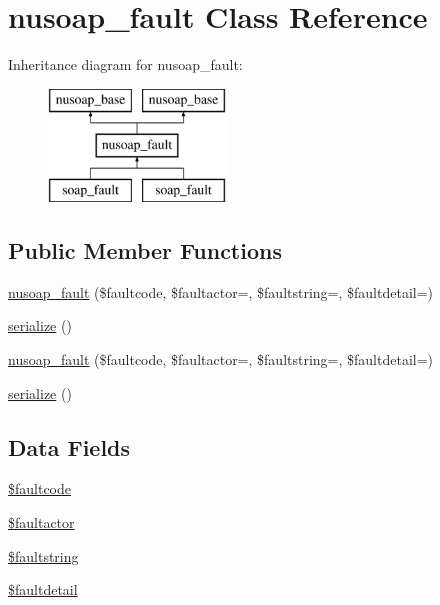 \hypertarget{classnusoap__fault}{}\section{nusoap\+\_\+fault Class Reference}
\label{classnusoap__fault}
Inheritance diagram for nusoap\+\_\+fault\+:\begin{figure}[H]
\begin{center}
\leavevmode
\includegraphics[height=3.000000cm]{classnusoap__fault}
\end{center}
\end{figure}
\subsection*{Public Member Functions}
\begin{DoxyCompactItemize}
\item 
\hyperlink{classnusoap__fault_a265d45a8d19659ed10f6956f5ee230dc}{nusoap\+\_\+fault} (\$faultcode, \$faultactor=\textquotesingle{}\textquotesingle{}, \$faultstring=\textquotesingle{}\textquotesingle{}, \$faultdetail=\textquotesingle{}\textquotesingle{})
\item 
\hyperlink{classnusoap__fault_a4d9813fea8525b19a1d370eeb8fe41d6}{serialize} ()
\item 
\hyperlink{classnusoap__fault_a265d45a8d19659ed10f6956f5ee230dc}{nusoap\+\_\+fault} (\$faultcode, \$faultactor=\textquotesingle{}\textquotesingle{}, \$faultstring=\textquotesingle{}\textquotesingle{}, \$faultdetail=\textquotesingle{}\textquotesingle{})
\item 
\hyperlink{classnusoap__fault_a4d9813fea8525b19a1d370eeb8fe41d6}{serialize} ()
\end{DoxyCompactItemize}
\subsection*{Data Fields}
\begin{DoxyCompactItemize}
\item 
\hyperlink{classnusoap__fault_a07e7ee58f39f98cdd8b2bd2b40ff72d7}{\$faultcode}
\item 
\hyperlink{classnusoap__fault_a671472ecd6911705ac4c919bba6d1eec}{\$faultactor}
\item 
\hyperlink{classnusoap__fault_acc1a7d86f9bd39e5717add56fbcdfaaa}{\$faultstring}
\item 
\hyperlink{classnusoap__fault_a7683364ae0ad0e22863a0f20f0626453}{\$faultdetail}
\end{DoxyCompactItemize}



